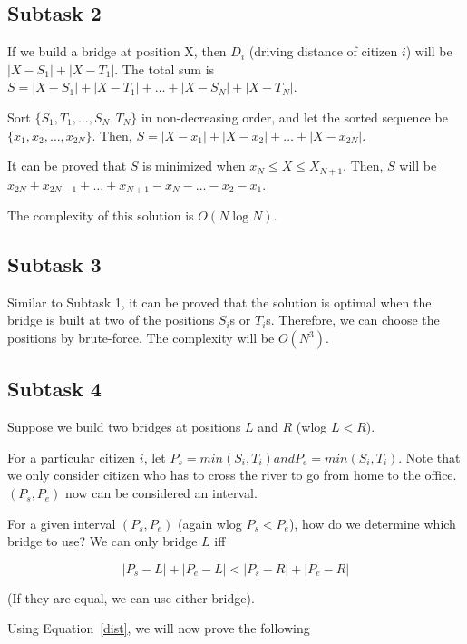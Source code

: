 \documentclass[a4paper]{article}
\begin{document}
\subsection*{Subtask 2}

If we build a bridge at position X, then $D_i$ (driving distance of citizen $i$) will be $| X - S_1 | + | X - T_1 |$. The total sum is $S = | X - S_1 | + | X - T_1 | + \dots + | X - S_N | + | X - T_N |$.

Sort $\{ S_1, T_1, \dots, S_N, T_N \}$ in non-decreasing order, and let the sorted sequence be $\{ x_1, x_2, \dots, x_{2N} \}$. Then, $S = | X - x_1 | + | X - x_2 | + \dots + | X - x_{2N} |$.

It can be proved that $S$ is minimized when $x_N \leq X \leq X_{N+1}$. Then, $S$ will be $x_{2N} + x_{2N-1} + \dots + x_{N+1} - x_N - \dots - x_2 - x_1$.

The complexity of this solution is $O(N \log N)$.

\subsection*{Subtask 3}

Similar to Subtask 1, it can be proved that the solution is optimal when the bridge is built at two of the positions $S_i$s or $T_i$s. Therefore, we can choose the positions by brute-force. The complexity will be $O(N^3)$.

\subsection*{Subtask 4}

Suppose we build two bridges at positions $L$ and $R$ (wlog $L < R$).

For a particular citizen $i$, let $P_s = min(S_i, T_i) and P_e = min(S_i, T_i)$. Note that we only consider citizen who has to cross the river to go from home to the office. $(P_s, P_e)$ now can be considered an interval.

For a given interval
$(P_s, P_e)$ (again wlog $P_s < P_e$), how do we determine which bridge to use? We can only bridge $L$
iff

\begin{equation}
\label{dist}
|P_s - L| + |P_e - L| < |P_s - R| + |P_e - R|
\end{equation}

(If they are equal, we can use either bridge).

Using Equation~\ref{dist}, we will now prove the following
\end{document}
